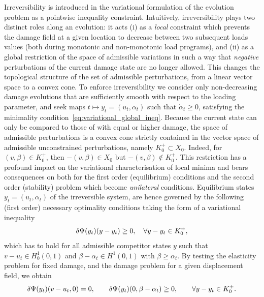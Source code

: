 \documentclass[10pt]{article}
\begin{document}
Irreversibility is introduced in the variational formulation of the evolution problem as a pointwise inequality constraint. Intuitively, irreversibility plays two distinct roles along an evolution: it acts (i) as a \emph{local} constraint which prevents the damage field at a given location to decrease between two subsequent loads values (both during monotonic and non-monotonic load programs), and (ii) as a global restriction of the space of admissible variations in such a way that \emph{negative} perturbations of the current damage state are no longer allowed. This changes the topological structure of the set of admissible perturbations, from a linear vector space to a convex cone. 
To enforce irreversibility we consider only non-decreasing damage evolutions that are sufficiently smooth with respect to the loading parameter, and seek maps $t\mapsto y_t = (u_t, \alpha_t)$ such that $\dot \alpha_t \geq 0$,  satisfying the minimality condition~\eqref{eq:variational_global_ineq}.
Because the current state can only be compared to those of with equal or higher damage, the space of admissible perturbations is a  convex cone strictly contained in the vector space of admissible unconstrained perturbations, namely $K^+_0\subset X_0$. Indeed, for $(v, \beta)\in K^+_0$, then $-(v, \beta) \in X_0$ but $-(v, \beta)\notin K^+_0$. This restriction has a profound impact on the variational characterisation of local minima and bears consequences on both for the first order (equilibrium) conditions and the second order (stability) problem which become \emph{unilateral} conditions.
%
Equilibrium states $y_t=(u_t, \alpha_t)$ of the irreversible system, are hence governed by the following (first order) necessary optimality conditions taking the form of a variational inequality
\begin{equation}
    \label{eq:eq_variational_inequality_full}
    \delta \Psi(y_t)(y-y_t) \geq 0, \quad \forall y-y_t \in K^+_0,
\end{equation}
%
which has to hold for all admissible competitor states $y$ such that $v-u_t \in H^1_0(0, 1)$ and $\beta-\alpha_t\in H^1(0,1)$ with $\beta \geq \alpha_t$.
%
%
By testing the elasticity problem for fixed damage, and the damage problem for a given displacement field, we obtain 
\begin{equation}
    \label{eq:variational_equilibrium} 
    \delta \Psi(y_t)(v-u_t, 0) = 0, \qquad \delta \Psi(y_t)(0, \beta-\alpha_t) \geq 0, \qquad \forall y-y_t \in K^+_{0}.
\end{equation}
\end{document}
